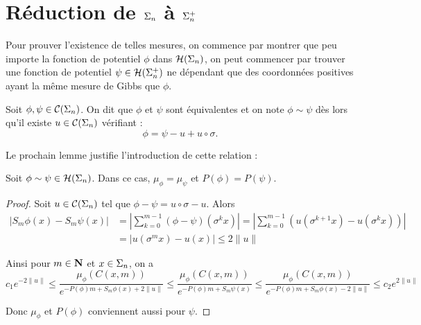 \section{Réduction de $\s_n$ à $\sp_n$}

  Pour prouver l'existence de telles mesures, on commence par montrer que peu importe la fonction de potentiel $\phi$ dans $\Hs{n}$,
  on peut commencer par trouver une fonction de potentiel $\psi \in \Hsp{n}$
  ne dépendant que des coordonnées positives ayant la même mesure de Gibbs que $\phi$.

  \begin{definition}
    \label{def:fn_equiv}
    \leanok
    Soit $\phi, \psi \in \Cs{n}$. On dit que $\phi$ et $\psi$ sont équivalentes et on note $\phi \sim \psi$ dès lors
    qu'il existe $u \in \Cs{n}$ vérifiant :
    $$\phi = \psi - u + u \circ \sigma.$$
  \end{definition}

  Le prochain lemme justifie l'introduction de cette relation :

  \begin{lemma}
    \label{lem:fn_equiv_imp_gibbs_eq}
    \leanok
    Soit $\phi \sim \psi \in \Hs{n}$. Dans ce cas, $\mu_{\phi} = \mu_{\psi}$ et $P(\phi) = P(\psi)$.
  \end{lemma}

  \begin{proof}
    Soit $u \in \Cs{n}$ tel que $\phi - \psi = u\circ \sigma - u$. Alors
    \begin{align*}\left|S_m\phi(x) - S_m\psi(x)\right| &= \left|\sum_{k=0}^{m-1}(\phi - \psi)(\sigma^k x)\right|
							= \left|\sum_{k=0}^{m-1}(u(\sigma^{k+1}x) - u(\sigma^k x))\right| \\
						       &= \left|u(\sigma^m x) - u(x)\right| \leq 2 \lVert u \rVert
    \end{align*}

    Ainsi pour $m \in \N$ et $x \in \s_n$, on a
    $$c_1 e^{-2\lVert u\rVert} \leq \frac{\mu_{\phi}(C(x, m))}{e^{-P(\phi)m + S_m\phi(x) + 2\lVert u\rVert}}
			       \leq \frac{\mu_{\phi} (C(x, m))}{e^{-P(\phi)m + S_m\psi(x)}}
			       \leq \frac{\mu_{\phi}(C(x, m))}{e^{-P(\phi)m + S_m\phi(x) - 2\lVert u\rVert}} \leq c_2 e^{2\lVert u\rVert}$$

    Donc $\mu_{\phi}$ et $P(\phi)$ conviennent aussi pour $\psi$.
  \end{proof}

